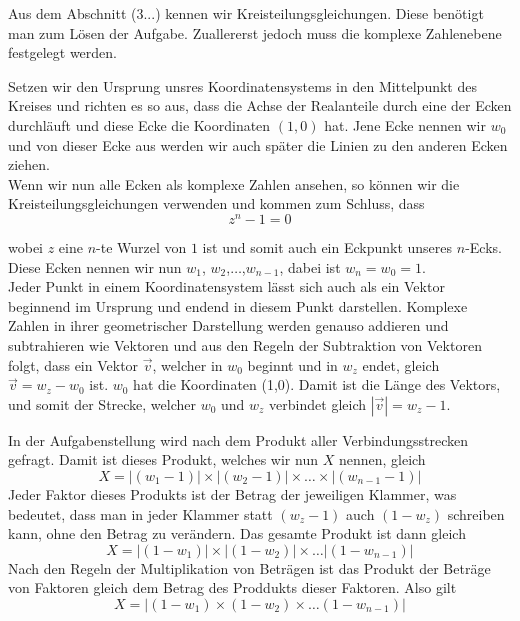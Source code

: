 \documentclass[a4paper,12pt]{article} %
\begin{document}
Aus dem Abschnitt (3...) kennen  wir Kreisteilungsgleichungen. Diese benötigt man zum Lösen der Aufgabe. Zuallererst jedoch muss die komplexe Zahlenebene festgelegt werden. 

Setzen wir den Ursprung unsres Koordinatensystems in den Mittelpunkt des Kreises und richten es so aus, dass die Achse der Realanteile durch eine der Ecken durchläuft und diese Ecke die Koordinaten $(1,0)$ hat.
Jene Ecke nennen wir $w_0$ und von dieser Ecke aus werden wir auch später die Linien zu den anderen Ecken ziehen.\\

Wenn wir nun alle Ecken als komplexe Zahlen ansehen, so können wir die Kreisteilungsgleichungen verwenden und kommen zum Schluss, dass
\begin{equation}
	z^n-1=0
\end{equation}

wobei $z$ eine $n$-te Wurzel von $1$ ist und somit auch ein Eckpunkt unseres $n$-Ecks.
Diese Ecken nennen wir nun $w_1$, $w_2$,$\dots$,$w_{n-1}$, dabei ist $w_n = w_0 = 1$.\\ 

Jeder Punkt in einem Koordinatensystem lässt sich auch als ein Vektor beginnend im Ursprung und endend in diesem Punkt darstellen. Komplexe Zahlen in ihrer geometrischer Darstellung werden genauso addieren und subtrahieren wie Vektoren und aus den Regeln der Subtraktion von Vektoren folgt, dass ein Vektor $\vec{v}$, welcher in $w_0$ beginnt und in $w_z$ endet, gleich $\vec{v}=w_z-w_0$ ist.
$w_0$ hat die Koordinaten (1,0).
Damit ist die Länge des Vektors, und somit der Strecke, welcher $w_0$ und $w_z$ verbindet gleich $|\vec{v}| = w_z - 1$.

In der Aufgabenstellung wird nach dem Produkt aller Verbindungsstrecken gefragt.
Damit ist dieses Produkt, welches wir nun $X$ nennen, gleich
\[X = |(w_1-1)|\times|(w_2-1)|\times\dots\times|(w_{n-1}-1)|\]
Jeder Faktor dieses Produkts ist der Betrag der jeweiligen Klammer, was bedeutet, dass man in jeder Klammer statt $(w_z-1)$ auch $(1-w_z)$ schreiben kann, ohne den Betrag zu verändern.
Das gesamte Produkt ist dann gleich 
\[X=|(1-w_1)|\times|(1-w_2)|\times\dots|(1-w_{n-1})|\]
Nach den Regeln der Multiplikation von Beträgen ist das Produkt der Beträge von Faktoren gleich dem Betrag des Proddukts dieser Faktoren. Also gilt
\begin{equation}\label{X}
	X=|(1-w_1)\times(1-w_2)\times\dots(1-w_{n-1})|
\end{equation}
\end{document}
